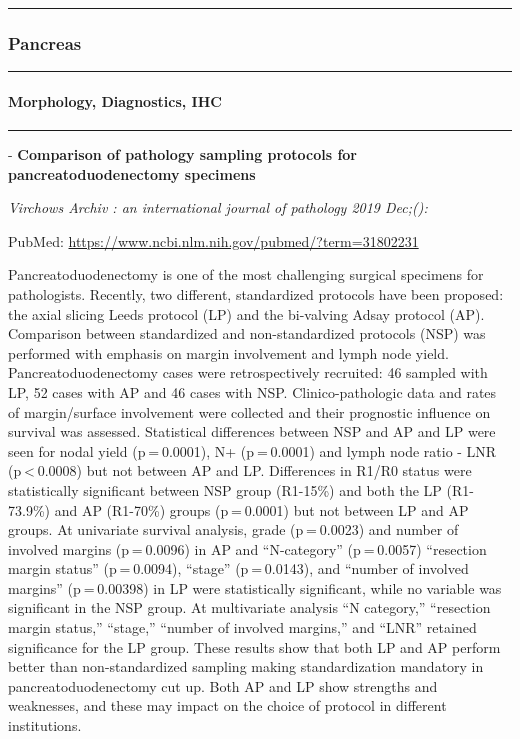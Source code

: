 \documentclass[
]{article}
\renewcommand{\linethickness}{0.05em}
\begin{document}
\begin{center}\rule{0.5\linewidth}{\linethickness}\end{center}

\hypertarget{pancreas}{%
\subsubsection{Pancreas}\label{pancreas}}

\begin{center}\rule{0.5\linewidth}{\linethickness}\end{center}

\hypertarget{pancreas_morphology}{%
\paragraph{Morphology, Diagnostics, IHC}\label{pancreas_morphology}}

\begin{center}\rule{0.5\linewidth}{\linethickness}\end{center}

- \textbf{Comparison of pathology sampling protocols for
pancreatoduodenectomy specimens}

\emph{Virchows Archiv : an international journal of pathology 2019
Dec;():}

PubMed: \url{https://www.ncbi.nlm.nih.gov/pubmed/?term=31802231}

Pancreatoduodenectomy is one of the most challenging surgical specimens
for pathologists. Recently, two different, standardized protocols have
been proposed: the axial slicing Leeds protocol (LP) and the bi-valving
Adsay protocol (AP). Comparison between standardized and
non-standardized protocols (NSP) was performed with emphasis on margin
involvement and lymph node yield. Pancreatoduodenectomy cases were
retrospectively recruited: 46 sampled with LP, 52 cases with AP and 46
cases with NSP. Clinico-pathologic data and rates of margin/surface
involvement were collected and their prognostic influence on survival
was assessed. Statistical differences between NSP and AP and LP were
seen for nodal yield (p = 0.0001), N+ (p = 0.0001) and lymph node ratio
- LNR (p \textless{} 0.0008) but not between AP and LP. Differences in
R1/R0 status were statistically significant between NSP group (R1-15\%)
and both the LP (R1-73.9\%) and AP (R1-70\%) groups (p = 0.0001) but not
between LP and AP groups. At univariate survival analysis, grade
(p = 0.0023) and number of involved margins (p = 0.0096) in AP and
``N-category'' (p = 0.0057) ``resection margin status'' (p = 0.0094),
``stage'' (p = 0.0143), and ``number of involved margins'' (p = 0.00398)
in LP were statistically significant, while no variable was significant
in the NSP group. At multivariate analysis ``N category,'' ``resection
margin status,'' ``stage,'' ``number of involved margins,'' and ``LNR''
retained significance for the LP group. These results show that both LP
and AP perform better than non-standardized sampling making
standardization mandatory in pancreatoduodenectomy cut up. Both AP and
LP show strengths and weaknesses, and these may impact on the choice of
protocol in different institutions.
\end{document}
